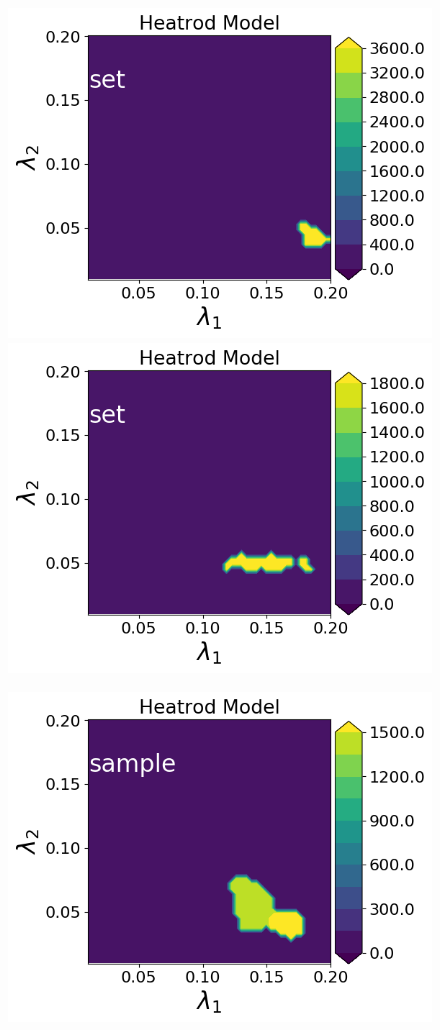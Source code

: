 \begin{figure}[h]
\begin{minipage}{.4\textwidth}
\includegraphics[width=\linewidth]{examples/fig_heatrod_q2/tHeatrodModel--set_N50_em.png}
\includegraphics[width=\linewidth]{examples/fig_heatrod_q2/tHeatrodModel--set_N500_em.png}
\end{minipage}
\begin{minipage}{.4\textwidth}
\includegraphics[width=\linewidth]{examples/fig_heatrod_q1/tHeatrodModel--sample_N50_mc.png}

\end{minipage}
\end{figure}
